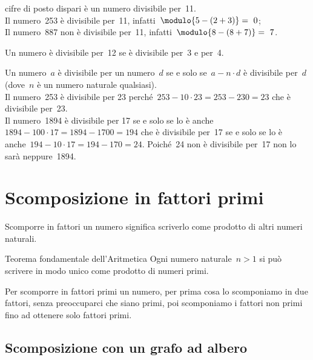 \begin{description} [noitemsep]
cifre di posto dispari è un numero divisibile per~11.\\
Il numero~253 è divisibile per~11, infatti~\(\modulo{5-(2+3)} =~0\);\\
Il numero~887 non è divisibile per~11, infatti~\(\modulo{8-(8+7)}=~7\).
\item[\textbf{12}:~] Un numero è divisibile per~12 se è 
divisibile 
per~3 e per~4.
\item[\textbf{un numero qualunque}:~] Un numero~\(a\) è divisibile 
per un numero~\(d\) se e solo se~\(a - n \cdot d\) è divisibile per~\(d\) 
(dove~\(n\) è un numero naturale qualsiasi).\\
Il numero~253 è divisibile per 23 
perché~\(253 - 10 \cdot 23 = 253 - 230 = 23\) che è divisibile per~23.\\
Il numero~1894 è divisibile per 17 se e solo se lo è 
anche~\(1894 - 100 \cdot 17 = 1894 - 1700 = 194\) 
che è divisibile per~17 se e solo se lo è
anche~\(194 - 10 \cdot 17 = 194 - 170 = 24\). 
Poiché~24 non è divisibile per~17 non lo sarà neppure~1894.
\end{description}



\section{Scomposizione in fattori primi}
\label{sec:nat_scomposizione}

Scomporre in fattori un numero significa scriverlo come prodotto di altri 
numeri naturali. 


\begin{teorema}{Teorema fondamentale dell'Aritmetica}{}
Ogni numero naturale~\(n>1\) si può scrivere in modo unico come prodotto di 
numeri primi.
\end{teorema}

Per scomporre in fattori primi un numero, per prima cosa lo scomponiamo in 
due fattori, senza preoccuparci che siano primi, poi scomponiamo i fattori
non primi fino ad ottenere solo fattori primi.

\subsection{Scomposizione con un grafo ad albero}

